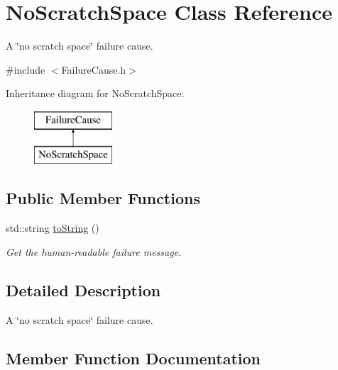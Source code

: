 \hypertarget{class_no_scratch_space}{}\section{No\+Scratch\+Space Class Reference}
\label{class_no_scratch_space}


A \char`\"{}no scratch space\char`\"{} failure cause.  




{\ttfamily \#include $<$Failure\+Cause.\+h$>$}

Inheritance diagram for No\+Scratch\+Space\+:\begin{figure}[H]
\begin{center}
\leavevmode
\includegraphics[height=2.000000cm]{class_no_scratch_space}
\end{center}
\end{figure}
\subsection*{Public Member Functions}
\begin{DoxyCompactItemize}
\item 
std\+::string \hyperlink{class_no_scratch_space_a042ed2a7e9451c61e8bea04684a02dfd}{to\+String} ()
\begin{DoxyCompactList}\small\item\em Get the human-\/readable failure message. \end{DoxyCompactList}\end{DoxyCompactItemize}


\subsection{Detailed Description}
A \char`\"{}no scratch space\char`\"{} failure cause. 

\subsection{Member Function Documentation}
\mbox{\label{class_no_scratch_space_a042ed2a7e9451c61e8bea04684a02dfd}} 
